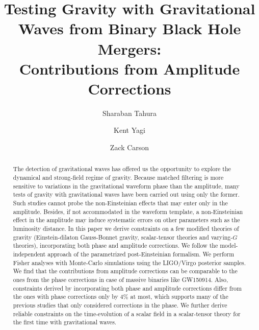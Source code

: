 \documentclass[prd,twocolumn,nofootinbib]{revtex4-1}
\begin{document}
\title{Testing Gravity with Gravitational Waves from Binary Black Hole Mergers: \\ Contributions from Amplitude Corrections}

\author{Sharaban Tahura}

\author{Kent Yagi}

\author{Zack Carson}

\begin{abstract}
The detection of gravitational waves has offered us the opportunity to explore the dynamical and strong-field regime of gravity.
Because matched filtering is more sensitive to variations in the gravitational waveform phase than the amplitude, many tests of gravity with gravitational waves have been carried out using only the former. Such studies cannot probe the non-Einsteinian effects that may enter only in the amplitude. Besides, if not accommodated in the waveform template, a non-Einsteinian effect in the amplitude may induce systematic errors on other parameters such as the luminosity distance.
In this paper we derive constraints on a few modified theories of gravity (Einstein-dilaton Gauss-Bonnet gravity, scalar-tensor theories and varying-$G$ theories), incorporating both phase and amplitude corrections. We follow the model-independent approach of the parametrized post-Einsteinian formalism.
We perform Fisher analyses with Monte-Carlo simulations using the LIGO/Virgo posterior samples.
We find that the contributions from amplitude corrections can be comparable to the ones from the phase corrections in case of massive binaries like GW150914.
Also, constraints derived by incorporating both phase and amplitude corrections differ from the ones with phase corrections only by 4\% at most, which supports many of the previous studies that only considered corrections in the phase.
We further derive reliable constraints on the time-evolution of a scalar field in a scalar-tensor theory for the first time with gravitational waves.



\end{abstract}
\end{document}
